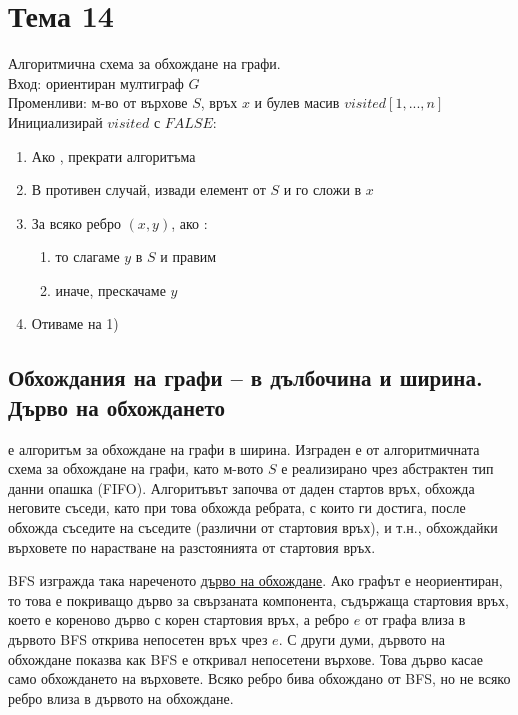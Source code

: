 \section{Тема 14}

Алгоритмична схема за обхождане на графи. \\
Вход: ориентиран мултиграф \(G\) \\
Променливи: м-во от върхове \(S\), връх \(x\) и булев масив \(visited[1, ..., n]\) \\
Инициализирай \(visited\) с \(FALSE\): 
\begin{enumerate}
    \item Ако , прекрати алгоритъма
    \item В противен случай, извади елемент от \(S\) и го сложи в \(x\)
    \item За всяко ребро \((x, y)\), ако :
    \begin{enumerate}
        \item то слагаме \(y\) в \(S\) и правим 
        \item иначе, прескачаме \(y\)
    \end{enumerate}
    \item Отиваме на 1)
\end{enumerate}

\subsection*{Обхождания на графи – в дълбочина и ширина. Дърво на обхождането}
 е алгоритъм за обхождане на графи в ширина. Изграден е от алгоритмичната 
схема за обхождане на графи, като м-вото \(S\) е реализирано чрез абстрактен тип данни опашка (FIFO). 
Алгоритъвът започва от даден стартов връх, обхожда неговите съседи, като при това обхожда ребрата, с 
които ги достига, после обхожда съседите на съседите (различни от стартовия връх), и т.н., обхождайки 
върховете по нарастване на разстоянията от стартовия връх.

BFS изгражда така нареченото \underline{дърво на обхождане}. Ако графът е неориентиран, то това е 
покриващо дърво за свързаната компонента, съдържаща стартовия връх, което е кореново дърво с корен 
стартовия връх, а ребро \(e\) от графа влиза в дървото \totw BFS открива непосетен връх чрез \(e\). 
С други думи, дървото на обхождане показва как BFS е откривал непосетени върхове. Това дърво касае само 
обхождането на върховете. Всяко ребро бива обхождано от BFS, но не всяко ребро влиза в дървото на 
обхождане.

